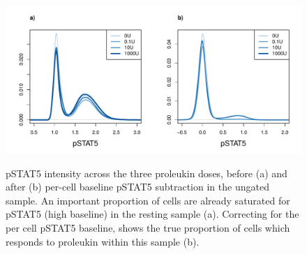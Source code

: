 \begin{figure}
\centering
\begin{minipage}{.8\textwidth}
\includegraphics[width=\linewidth]{figures/pstat5-baseline-relative}
\end{minipage}
\begin{minipage}{\textwidth}
{ pSTAT5 intensity across the three proleukin doses, before (a) and after (b) per-cell baseline pSTAT5 subtraction in the ungated sample.}
{
  An important proportion of cells are already saturated for pSTAT5 (high baseline) in the resting sample (a).
  Correcting for the per cell pSTAT5 baseline, shows the true proportion of cells which responds to proleukin within this sample (b).
}
\end{minipage}
\end{figure}


